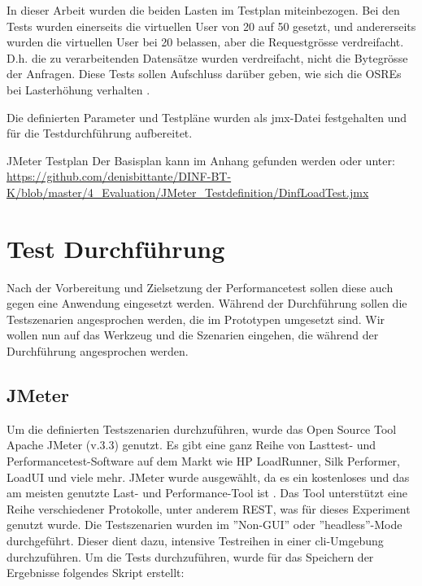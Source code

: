 \documentclass[main.tex]{subfiles}
\begin{document}
In dieser Arbeit wurden die beiden Lasten im Testplan miteinbezogen. Bei den Tests wurden einerseits die virtuellen User von 20 auf 50 gesetzt, und andererseits wurden die virtuellen User bei 20 belassen, aber die Requestgrösse verdreifacht. D.h. die zu verarbeitenden Datensätze wurden verdreifacht, nicht die Bytegrösse der Anfragen. Diese Tests sollen Aufschluss darüber geben, wie sich die OSREs bei Lasterhöhung verhalten \cite[Kap.~5]{Halili:2008:AJ:1481606}.

Die definierten Parameter und Testpläne wurden als jmx-Datei festgehalten und für die Testdurchführung aufbereitet.

\begin{reference}{JMeter Testplan}
Der Basisplan kann im Anhang gefunden werden oder unter: 
 \url{https://github.com/denisbittante/DINF-BT-K/blob/master/4_Evaluation/JMeter_Testdefinition/DinfLoadTest.jmx}
 
\end{reference}



\section{Test Durchführung}

Nach der Vorbereitung und Zielsetzung der Performancetest sollen diese auch gegen eine Anwendung eingesetzt werden. Während der Durchführung sollen die Testszenarien angesprochen werden, die im Prototypen umgesetzt sind. Wir wollen nun auf das Werkzeug und die Szenarien eingehen, die  während der Durchführung angesprochen werden. 
 
\subsection{JMeter}


Um die definierten Testszenarien durchzuführen, wurde das Open Source Tool Apache JMeter (v.3.3) genutzt. Es gibt eine ganz Reihe von Lasttest- und Performancetest-Software auf dem Markt wie HP LoadRunner, Silk Performer, LoadUI und viele mehr. JMeter wurde ausgewählt, da es ein kostenloses und das am meisten genutzte Last- und Performance-Tool ist \cite[Kap.~2]{Halili:2008:AJ:1481606}. Das Tool unterstützt eine Reihe verschiedener Protokolle, unter anderem REST, was für dieses Experiment genutzt wurde. Die Testszenarien wurden im ''Non-GUI'' oder ''headless''-Mode durchgeführt. Dieser dient dazu, intensive Testreihen in einer \acrshort{cli}-Umgebung durchzuführen. Um die Tests durchzuführen, wurde für das Speichern der Ergebnisse folgendes Skript erstellt:
\end{document}

